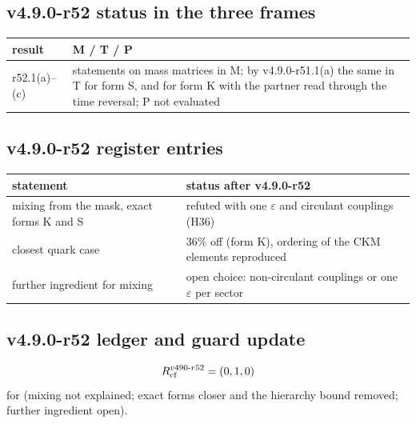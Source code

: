 \subsection*{v4.9.0-r52 status in the three frames}
\label{subsec:v490-r52-frames}

\begin{center}
\small
\begin{tabular}{@{}>{\raggedright\arraybackslash}p{}>{\raggedright\arraybackslash}p{}@{}}
\toprule
result & M / T / P\\
\midrule
r52.1(a)--(c) & statements on mass matrices in M; by v4.9.0-r51.1(a) the same in T for form S, and for form K with the partner read through the time reversal; P not evaluated\\
\bottomrule
\end{tabular}
\end{center}

\subsection*{v4.9.0-r52 register entries}
\label{subsec:v490-r52-register}

\begin{center}
\small
\begin{tabular}{@{}>{\raggedright\arraybackslash}p{}>{\raggedright\arraybackslash}p{}@{}}
\toprule
statement & status after v4.9.0-r52\\
\midrule
mixing from the mask, exact forms K and S & refuted with one \(\varepsilon\) and circulant couplings (H36)\\
closest quark case & \(36\%\) off (form K), ordering of the CKM elements reproduced\\
further ingredient for mixing & open choice: non-circulant couplings or one \(\varepsilon\) per sector\\
\bottomrule
\end{tabular}
\end{center}

\subsection*{v4.9.0-r52 ledger and guard update}
\label{subsec:v490-r52-ledger-guard}

\[
R_{\rm cf}^{v490\text{-}r52}=(0,1,0)
\]
for (mixing not explained; exact forms closer and the hierarchy bound removed; further ingredient open).

